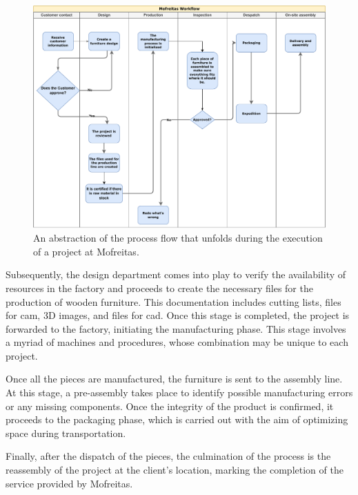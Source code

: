 \begin{figure}[H]
    \centering
    \includegraphics[width=.98\linewidth]{images/Development/chap3/Mofreitas Process.pdf}
    \caption{An abstraction of the process flow that unfolds during the execution of a project at Mofreitas.}
    \label{fig:MofreitasWorkflow}
\end{figure}

Subsequently, the design department comes into play to verify the availability of resources in the factory and proceeds to create the necessary files for the production of wooden furniture. This documentation includes cutting lists, files for \acrfull{cam}, 3D images, and files for \acrfull{cad}. Once this stage is completed, the project is forwarded to the factory, initiating the manufacturing phase. This stage involves a myriad of machines and procedures, whose combination may be unique to each project.


Once all the pieces are manufactured, the furniture is sent to the assembly line. At this stage, a pre-assembly takes place to identify possible manufacturing errors or any missing components. Once the integrity of the product is confirmed, it proceeds to the packaging phase, which is carried out with the aim of optimizing space during transportation.

Finally, after the dispatch of the pieces, the culmination of the process is the reassembly of the project at the client's location, marking the completion of the service provided by Mofreitas.

